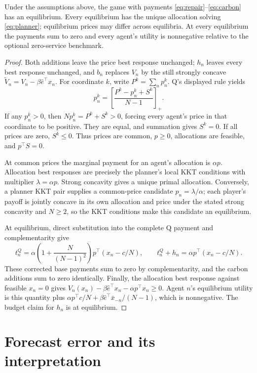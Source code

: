 \documentclass{article}
\begin{document}
\begin{theorem}
Under the assumptions above, the game with payments \eqref{eq:repair}--\eqref{eq:carbon} has an equilibrium. Every equilibrium has the unique allocation solving \eqref{eq:planner}; equilibrium prices may differ across equilibria. At every equilibrium the payments sum to zero and every agent's utility is nonnegative relative to the optional zero-service benchmark. %
\end{theorem}
\begin{proof}
Both additions leave the price best response unchanged; \(h_n\) leaves every best response unchanged, and \(b_n\) replaces \(V_n\) by the still strongly concave \(\widetilde V_n=V_n-\beta\hat e^\top x_n\). For coordinate \(k\), write \(P^k=\sum_n p_n^k\). Q's displayed rule yields
\[
p_n^k=\left[\frac{P^k-p_n^k+S^k}{N-1}\right]_+.
\]
If any \(p_n^k>0\), then \(Np_n^k=P^k+S^k>0\), forcing every agent's price in that coordinate to be positive. They are equal, and summation gives \(S^k=0\). If all prices are zero, \(S^k\leq0\). Thus prices are common, \(p\geq0\), allocations are feasible, and \(p^\top S=0\). %

At common prices the marginal payment for an agent's allocation is \(\alpha p\). Allocation best responses are precisely the planner's local KKT conditions with multiplier \(\lambda=\alpha p\). Strong concavity gives a unique primal allocation. Conversely, a planner KKT pair supplies a common-price candidate \(p_n=\lambda/\alpha\); each player's payoff is jointly concave in its own allocation and price under the stated strong concavity and \(N\geq2\), so the KKT conditions make this candidate an equilibrium. %

At equilibrium, direct substitution into the complete Q payment and complementarity give
\[
t_n^Q=\alpha\left(1+\frac{N}{(N-1)^2}\right)p^\top(x_n-c/N),
\qquad t_n^Q+h_n=\alpha p^\top(x_n-c/N).
\]
These corrected base payments sum to zero by complementarity, and the carbon additions sum to zero identically. Finally, the allocation best response against feasible \(x_n=0\) gives \(V_n(x_n)-\beta\hat e^\top x_n-\alpha p^\top x_n\geq0\). Agent \(n\)'s equilibrium utility is this quantity plus \(\alpha p^\top c/N+\beta\hat e^\top\bar x_{-n}/(N-1)\), which is nonnegative. The budget claim for \(h_n\) is at equilibrium. %
\end{proof}

\section{Forecast error and its interpretation}
\end{document}
